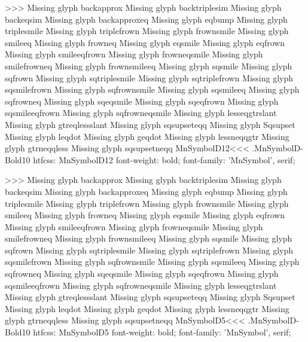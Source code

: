 >>>
Missing glyph	backapprox
Missing glyph	backtriplesim
Missing glyph	backeqsim
Missing glyph	backapproxeq
Missing glyph	eqbump
Missing glyph	triplesmile
Missing glyph	triplefrown
Missing glyph	frownsmile
Missing glyph	smileeq
Missing glyph	frowneq
Missing glyph	eqsmile
Missing glyph	eqfrown
Missing glyph	smileeqfrown
Missing glyph	frowneqsmile
Missing glyph	smilefrowneq
Missing glyph	frownsmileeq
Missing glyph	sqsmile
Missing glyph	sqfrown
Missing glyph	sqtriplesmile
Missing glyph	sqtriplefrown
Missing glyph	sqsmilefrown
Missing glyph	sqfrownsmile
Missing glyph	sqsmileeq
Missing glyph	sqfrowneq
Missing glyph	sqeqsmile
Missing glyph	sqeqfrown
Missing glyph	sqsmileeqfrown
Missing glyph	sqfrowneqsmile
Missing glyph	lesseqgtrslant
Missing glyph	gtreqlessslant
Missing glyph	sqsupseteqq
Missing glyph	Sqsupset
Missing glyph	leqdot
Missing glyph	geqdot
Missing glyph	lessneqqgtr
Missing glyph	gtrneqqless
Missing glyph	sqsupsetneqq
\<MnSymbolD12\><<<
.MnSymbolD-Bold10
htfcss:  MnSymbolD12  font-weight: bold; font-family: 'MnSymbol', serif;

>>>
Missing glyph	backapprox
Missing glyph	backtriplesim
Missing glyph	backeqsim
Missing glyph	backapproxeq
Missing glyph	eqbump
Missing glyph	triplesmile
Missing glyph	triplefrown
Missing glyph	frownsmile
Missing glyph	smileeq
Missing glyph	frowneq
Missing glyph	eqsmile
Missing glyph	eqfrown
Missing glyph	smileeqfrown
Missing glyph	frowneqsmile
Missing glyph	smilefrowneq
Missing glyph	frownsmileeq
Missing glyph	sqsmile
Missing glyph	sqfrown
Missing glyph	sqtriplesmile
Missing glyph	sqtriplefrown
Missing glyph	sqsmilefrown
Missing glyph	sqfrownsmile
Missing glyph	sqsmileeq
Missing glyph	sqfrowneq
Missing glyph	sqeqsmile
Missing glyph	sqeqfrown
Missing glyph	sqsmileeqfrown
Missing glyph	sqfrowneqsmile
Missing glyph	lesseqgtrslant
Missing glyph	gtreqlessslant
Missing glyph	sqsupseteqq
Missing glyph	Sqsupset
Missing glyph	leqdot
Missing glyph	geqdot
Missing glyph	lessneqqgtr
Missing glyph	gtrneqqless
Missing glyph	sqsupsetneqq
\<MnSymbolD5\><<<
.MnSymbolD-Bold10
htfcss:  MnSymbolD5  font-weight: bold; font-family: 'MnSymbol', serif;

